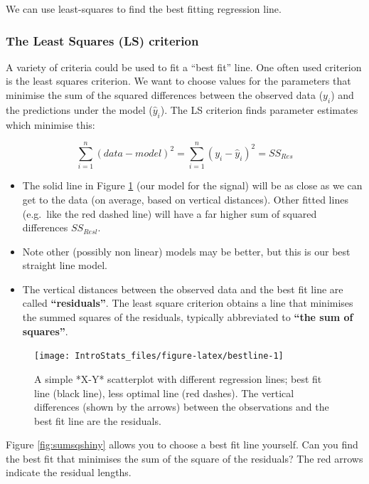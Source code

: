 \documentclass[
  oneside]{krantz}
\begin{document}
We can use least-squares to find the best fitting regression line.

\hypertarget{the-least-squares-ls-criterion}{%
\subsubsection{The Least Squares (LS) criterion}\label{the-least-squares-ls-criterion}}

A variety of criteria could be used to fit a ``best fit'' line. One often used criterion is the least squares criterion. We want to choose values for the parameters that minimise the sum of the squared differences between the observed data (\(y_i\)) and the predictions under the model (\(\hat{y}_i\)). The LS criterion finds parameter estimates which minimise this:

\[\sum_{i=1}^n (data-model)^2=\sum_{i=1}^n (y_i-\hat{y}_i)^2 = SS_{Res} \]

\begin{itemize}
\item
  The solid line in Figure \ref{fig:bestline} (our model for the signal) will be as close as we can get to the data (on average, based on vertical distances). Other fitted lines (e.g.~like the red dashed line) will have a far higher sum of squared differences \(SS_{Resl}\).
\item
  Note other (possibly non linear) models may be better, but this is our best straight line model.
\item
  The vertical distances between the observed data and the best fit line are called \textbf{``residuals''}. The least square criterion obtains a line that minimises the summed squares of the residuals, typically abbreviated to \textbf{``the sum of squares''}.
\end{itemize}

\begin{figure}

{\centering \texttt{[image: IntroStats\_files/figure-latex/bestline-1]} 

}

\caption{A simple *X-Y* scatterplot with different regression lines; best fit line (black line), less optimal line (red dashes). The vertical differences (shown by the arrows) between the observations and the best fit line are the residuals.}\label{fig:bestline}
\end{figure}

Figure \ref{fig:sumsqshiny} allows you to choose a best fit line yourself. Can you find the best fit that minimises the sum of the square of the residuals? The red arrows indicate the residual lengths.
\end{document}
